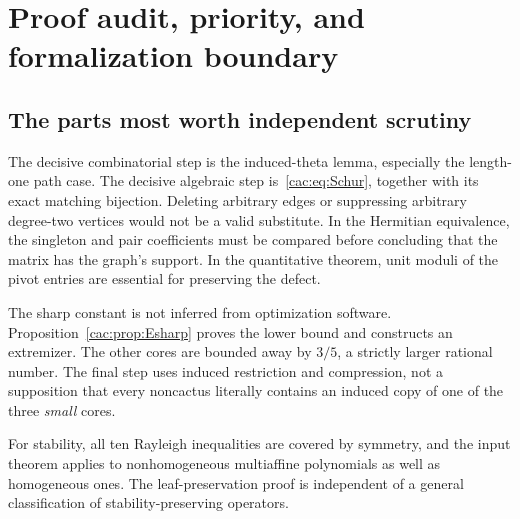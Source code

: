 \documentclass[11pt]{article}
\numberwithin{equation}{section}
\theoremstyle{definition}
\begin{document}
\section{Proof audit, priority, and formalization boundary}
\label{cac:sec:audit}

\subsection{The parts most worth independent scrutiny}
The decisive combinatorial step is the induced-theta lemma, especially the length-one path case. The decisive algebraic step is~\eqref{cac:eq:Schur}, together with its exact matching bijection. Deleting arbitrary edges or suppressing arbitrary degree-two vertices would not be a valid substitute. In the Hermitian equivalence, the singleton and pair coefficients must be compared before concluding that the matrix has the graph's support. In the quantitative theorem, unit moduli of the pivot entries are essential for preserving the defect.

The sharp constant is not inferred from optimization software. Proposition~\ref{cac:prop:Esharp} proves the lower bound and constructs an extremizer. The other cores are bounded away by $3/5$, a strictly larger rational number. The final step uses induced restriction and compression, not a supposition that every noncactus literally contains an induced copy of one of the three \emph{small} cores.

For stability, all ten Rayleigh inequalities are covered by symmetry, and the input theorem applies to nonhomogeneous multiaffine polynomials as well as homogeneous ones. The leaf-preservation proof is independent of a general classification of stability-preserving operators.
\end{document}
